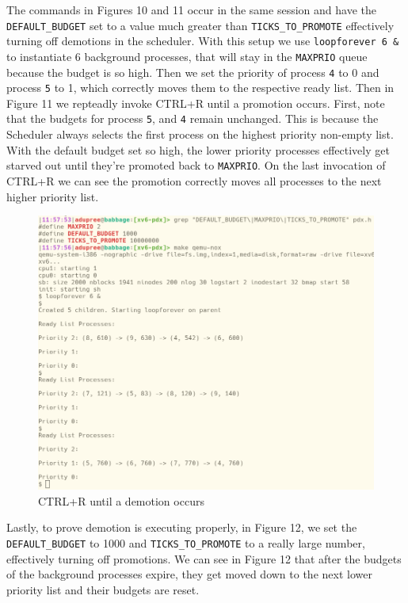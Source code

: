 \documentclass[11pt,letterpaper]{report}
\newcommand{\code}[1]{\colorbox{codegray}{\texttt{#1}}}
\begin{document}
{  The commands in Figures 10 and 11 occur in the same session and have the \code{DEFAULT\_BUDGET}
  set to a value much greater than \code{TICKS\_TO\_PROMOTE} effectively turning off demotions in 
  the scheduler. With this setup we use \code{loopforever 6 \&} to instantiate 6 background 
  processes, that will stay in the \code{MAXPRIO} queue because the budget is so high. Then 
  we set the priority of process \code{4} to 0 and process \code{5} to 1, which correctly 
  moves them to the respective ready list. Then in Figure 11 we repteadly invoke CTRL+R until a 
  promotion occurs. First, note that the budgets for process \code{5}, and \code{4} remain unchanged.
  This is because the Scheduler always selects the first process on the highest priority non-empty 
  list. With the default budget set so high, the lower priority processes effectively 
  get starved out until they're promoted back to \code{MAXPRIO}. On the last invocation of CTRL+R we 
  can see the promotion correctly moves all processes to the next higher priority list. 

  \begin{figure}[h!]
	\centering
	\includegraphics[width=1\linewidth]{maxprio-2-lists3.png}
	\caption[img]{CTRL+R until a demotion occurs}
	\label{fig:P1compileP0-1}
  \end{figure}

  Lastly, to prove demotion is executing properly, in Figure 12, we set the \code{DEFAULT\_BUDGET} to 1000 and 
  \code{TICKS\_TO\_PROMOTE} to a really large number, effectively turning off promotions. We can 
  see in Figure 12 that after the budgets of the background processes expire, they get moved 
  down to the next lower priority list and their budgets are reset. 

}
\end{document}
